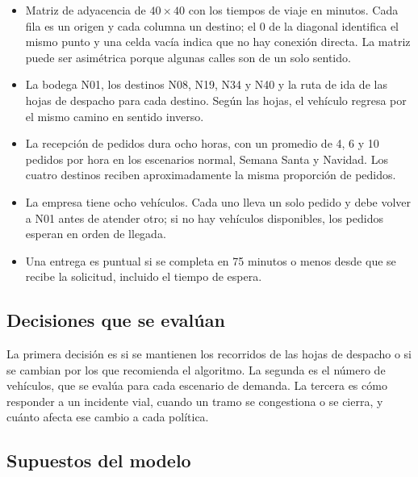 \documentclass[11pt,letterpaper]{article}
\begin{document}
\begin{itemize}
  \item Matriz de adyacencia de $40\times 40$ con los tiempos de viaje en minutos. Cada fila es un origen y cada columna un destino; el 0 de la diagonal identifica el mismo punto y una celda vacía indica que no hay conexión directa. La matriz puede ser asimétrica porque algunas calles son de un solo sentido.
  \item La bodega N01, los destinos N08, N19, N34 y N40 y la ruta de ida de las hojas de despacho para cada destino. Según las hojas, el vehículo regresa por el mismo camino en sentido inverso.
  \item La recepción de pedidos dura ocho horas, con un promedio de 4, 6 y 10 pedidos por hora en los escenarios normal, Semana Santa y Navidad. Los cuatro destinos reciben aproximadamente la misma proporción de pedidos.
  \item La empresa tiene ocho vehículos. Cada uno lleva un solo pedido y debe volver a N01 antes de atender otro; si no hay vehículos disponibles, los pedidos esperan en orden de llegada.
  \item Una entrega es puntual si se completa en 75 minutos o menos desde que se recibe la solicitud, incluido el tiempo de espera.
\end{itemize}

\subsection{Decisiones que se evalúan}

La primera decisión es si se mantienen los recorridos de las hojas de despacho o si se cambian por los que recomienda el algoritmo. La segunda es el número de vehículos, que se evalúa para cada escenario de demanda. La tercera es cómo responder a un incidente vial, cuando un tramo se congestiona o se cierra, y cuánto afecta ese cambio a cada política.

\subsection{Supuestos del modelo}
\end{document}
